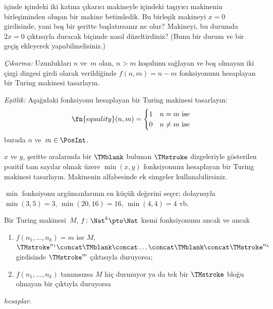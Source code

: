 \begin{prob}
 içinde
 içindeki iki katına çıkarıcı makineyle
 içindeki taşıyıcı makinenin birleşiminden
oluşan bir makine betimledik. Bu birleşik makineyi $x=0$ girdisinde, yani boş
bir şeritte başlatırsanız ne olur? Makineyi, bu durumda $2x=0$ çıktısıyla
duracak biçimde nasıl düzeltirdiniz? (Bunu bir durum ve bir geçiş ekleyerek
yapabilmelisiniz.)
\end{prob}

\begin{prob}
\emph{Çıkarma:} Uzunlukları $n$ ve~$m$ olan, $n>m$ koşulunu sağlayan ve boş
olmayan iki çizgi dizgesi girdi olarak verildiğinde $f(n,m)=n-m$ fonksiyonunu
hesaplayan bir Turing makinesi tasarlayın.
\end{prob}

\begin{prob}
\emph{Eşitlik:} Aşağıdaki fonksiyonu hesaplayan bir Turing makinesi
tasarlayın:
\[
\fn{equality}(n,m) = 
\begin{cases}
  \text{1} & \text{$n = m$ ise} \\
  \text{0} & \text{$n \neq m$ ise}
\end{cases}
\]
burada $n$ ve~$m \in \PosInt$.
\end{prob}

\begin{prob}
$x$ ve $y$, şeritte aralarında bir $\TMblank$ bulunan $\TMstroke$
dizgeleriyle gösterilen pozitif tam sayılar olmak üzere $\min(x,y)$
fonksiyonunu hesaplayan bir Turing makinesi tasarlayın. Makinenin
alfabesinde ek simgeler kullanabilirsiniz.

$\min$ fonksiyonu argümanlarının en küçük değerini seçer; dolayısıyla
$\min(3,5)=3$, $\min(20,16)=16$, $\min(4,4)=4$ vb.
\end{prob}

\begin{defn}
  Bir Turing makinesi~$M$, $f\colon \Nat^k \pto \Nat$ kısmi fonksiyonunu
  ancak ve ancak
  \begin{enumerate}
    \item $f(n_1, \dots, n_k)=m$ ise $M$, $\TMstroke^{n_1}\concat\TMblank\concat
    \dots \concat\TMblank\concat\TMstroke^{n_k}$ girdisinde
    $\TMstroke^{m}$ çıktısıyla duruyorsa;
    \item $f(n_1, \dots, n_k)$ tanımsızsa $M$ hiç durmuyor ya da tek bir
    $\TMstroke$ bloğu olmayan bir çıktıyla duruyorsa
  \end{enumerate}
  \emph{hesaplar}.
\end{defn}

